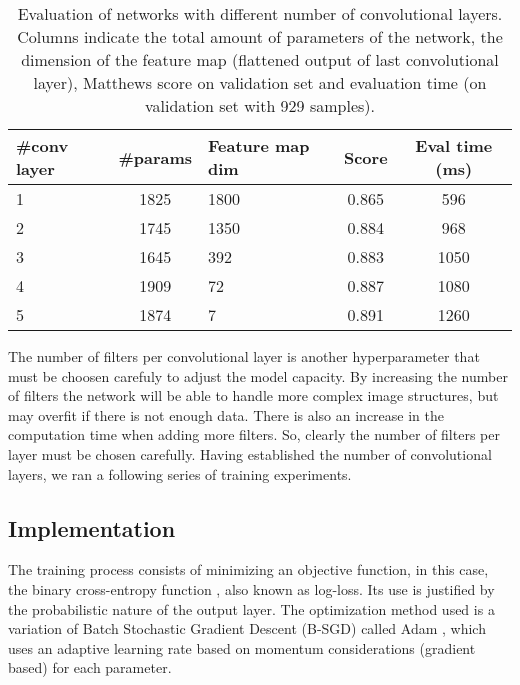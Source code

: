 	\begin{table}
	 \begin{center}
	  \label{table:evalNumberConvLayers}
	  \caption{Evaluation of networks with different number of convolutional layers. Columns indicate the total amount of parameters of the network, the dimension of the feature map (flattened output of last convolutional layer), Matthews score on validation set and evaluation time (on validation set with 929 samples).}
	  \begin{tabular}{ | l | c | l | c | c |}
	    \hline
	    \#conv layer & \#params & Feature map dim & Score & Eval time (ms)   \\ \hline
	    1            & 1825    &  1800           & 0.865 &  596             \\ 
	    2            & 1745    &  1350           & 0.884 &  968             \\ 
	    3            & 1645    &  392            & 0.883 &  1050            \\ 
	    4            & 1909    &  72             & 0.887 &  1080            \\ 
	    5            & 1874    &  7              & 0.891 &  1260            \\ \hline
		  \end{tabular}
		\end{center}
	 \end{table}

        The number of filters per convolutional layer is another hyperparameter that must be choosen carefuly to adjust the model capacity. By increasing the number of filters the network will be able to handle more complex image structures, but may overfit if there is not enough data. There is also an increase in the computation time when adding more filters. So, clearly the number of filters per layer must be chosen carefully.  Having established the number of convolutional layers, we ran a following series of training experiments.

    \subsection{Implementation}
        The training process consists of minimizing an objective function, in this case, the binary cross-entropy function \cite{DLbook}, also known as log-loss. Its use is justified by the probabilistic nature of the output layer. The optimization method used is a variation of Batch Stochastic Gradient Descent (B-SGD) called Adam \cite{kingma2014adam}, which uses an adaptive learning rate based on momentum considerations (gradient based) for each parameter.

